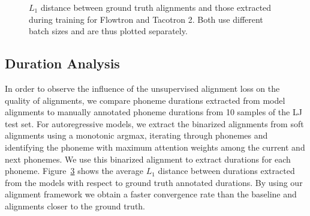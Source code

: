 \begin{figure}[h]
%     
\begin{subfigure}{\linewidth}
    \label{fig:flowtron_duration_diff}
    \hfill\hspace{1.0cm}
 \end{subfigure}
 \begin{subfigure}{\linewidth}
    \label{fig:tacotron_duration_diff}
    \vspace{-1.2cm}  %
    \hfill\hspace{1.0cm}
 \end{subfigure}
 \vspace{-1\baselineskip}
 \caption{$L_1$ distance between ground truth alignments and those extracted during training for Flowtron and Tacotron 2. Both use different batch sizes and are thus plotted separately. %
 }
 \label{fig:duration_diff}
 \vspace*{-1.5\baselineskip}
\end{figure}

\subsection{Duration Analysis}
In order to observe the influence of the unsupervised alignment loss on the quality of alignments, we compare phoneme durations extracted from model alignments to manually annotated phoneme durations from 10 samples of the LJ test set. For autoregressive models, we extract the binarized alignments from soft alignments using a monotonic argmax, iterating through phonemes and identifying the phoneme with maximum attention weights among the current and next phonemes. We use this binarized alignment to extract durations for each phoneme. Figure~\ref{fig:duration_diff} shows the average $L_1$ distance between durations extracted from the models with respect to ground truth annotated durations. By using our alignment framework we obtain a faster convergence rate than the baseline and alignments closer to the ground truth.


